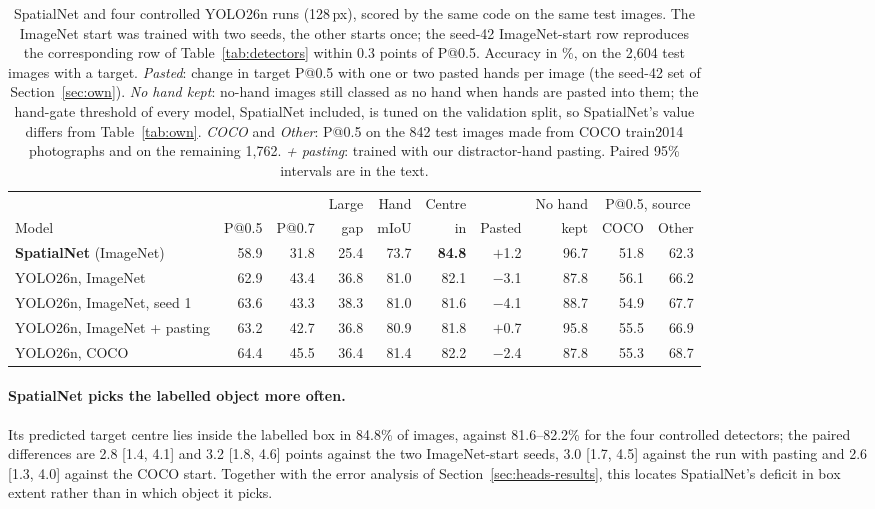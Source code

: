 \begin{table}[t]
  \caption{SpatialNet and four controlled YOLO26n runs (128\,px), scored by the same code on the same test images. The ImageNet start was trained with two seeds, the other starts once; the seed-42 ImageNet-start row reproduces the corresponding row of Table~\ref{tab:detectors} within 0.3 points of P@0.5. Accuracy in \%, on the 2,604 test images with a target. \emph{Pasted}: change in target P@0.5 with one or two pasted hands per image (the seed-42 set of Section~\ref{sec:own}). \emph{No hand kept}: no-hand images still classed as no hand when hands are pasted into them; the hand-gate threshold of every model, SpatialNet included, is tuned on the validation split, so SpatialNet's value differs from Table~\ref{tab:own}. \emph{COCO} and \emph{Other}: P@0.5 on the 842 test images made from COCO train2014 photographs and on the remaining 1,762. \emph{+ pasting}: trained with our distractor-hand pasting. Paired 95\% intervals are in the text.}
  \label{tab:controlled}
  \footnotesize
  \setlength{\tabcolsep}{2.6pt}
  \begin{tabular}{lrrrrrrrrr}
    \toprule
    & & & Large & Hand & Centre & & No hand & \multicolumn{2}{c}{P@0.5, source} \\
    \cmidrule(l){9-10}
    Model & P@0.5 & P@0.7 & gap & mIoU & in & Pasted & kept & COCO & Other \\
    \midrule
    \textbf{SpatialNet} (ImageNet) & 58.9 & 31.8 & 25.4 & 73.7 & \textbf{84.8} & $+$1.2 & 96.7 & 51.8 & 62.3 \\
    YOLO26n, ImageNet & 62.9 & 43.4 & 36.8 & 81.0 & 82.1 & $-$3.1 & 87.8 & 56.1 & 66.2 \\
    YOLO26n, ImageNet, seed 1 & 63.6 & 43.3 & 38.3 & 81.0 & 81.6 & $-$4.1 & 88.7 & 54.9 & 67.7 \\
    YOLO26n, ImageNet + pasting & 63.2 & 42.7 & 36.8 & 80.9 & 81.8 & $+$0.7 & 95.8 & 55.5 & 66.9 \\
    YOLO26n, COCO & 64.4 & 45.5 & 36.4 & 81.4 & 82.2 & $-$2.4 & 87.8 & 55.3 & 68.7 \\
    \bottomrule
  \end{tabular}
\end{table}

\paragraph{SpatialNet picks the labelled object more often.} Its predicted target centre lies inside the labelled box in 84.8\% of images, against 81.6--82.2\% for the four controlled detectors; the paired differences are 2.8 [1.4, 4.1] and 3.2 [1.8, 4.6] points against the two ImageNet-start seeds, 3.0 [1.7, 4.5] against the run with pasting and 2.6 [1.3, 4.0] against the COCO start. Together with the error analysis of Section~\ref{sec:heads-results}, this locates SpatialNet's deficit in box extent rather than in which object it picks.

